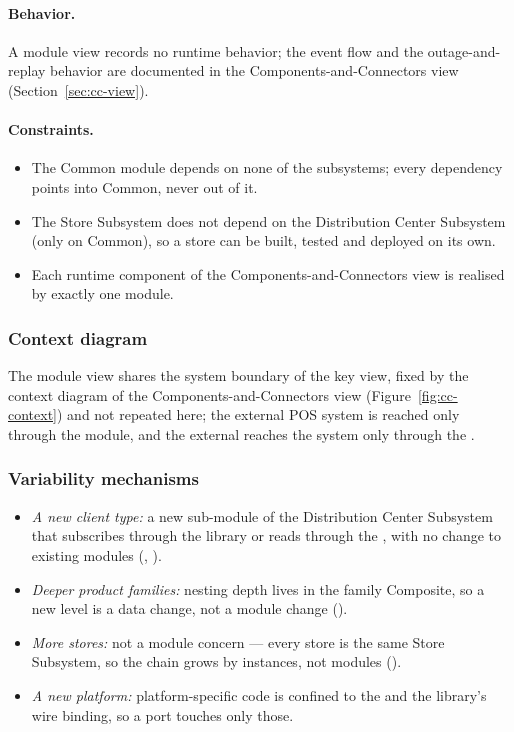 \paragraph{Behavior.}
A module view records no runtime behavior; the event flow and the outage-and-replay
behavior are documented in the Components-and-Connectors view (Section~\ref{sec:cc-view}).

\paragraph{Constraints.}
\begin{itemize}[nosep]
  \item The Common module depends on none of the subsystems; every dependency points into
  Common, never out of it.
  \item The Store Subsystem does not depend on the Distribution Center Subsystem (only on
  Common), so a store can be built, tested and deployed on its own.
  \item Each runtime component of the Components-and-Connectors view is realised by exactly
  one module.
\end{itemize}

\subsubsection{Context diagram}
The module view shares the system boundary of the key view, fixed by the context diagram
of the Components-and-Connectors view (Figure~\ref{fig:cc-context}) and not repeated here;
the external POS system is reached only through the \POSAdapter module, and the external
\AnalyticsClient reaches the system only through the \InventoryQuery.

\subsubsection{Variability mechanisms}
\label{sec:module-variability}
\begin{itemize}[nosep]
  \item \emph{A new client type:} a new sub-module of the Distribution Center Subsystem
  that subscribes through the \IEP library or reads through the \InventoryQuery, with no
  change to existing modules (, ).
  \item \emph{Deeper product families:} nesting depth lives in the family Composite, so a
  new level is a data change, not a module change ().
  \item \emph{More stores:} not a module concern --- every store is the same Store
  Subsystem, so the chain grows by instances, not modules ().
  \item \emph{A new platform:} platform-specific code is confined to the \POSAdapter and
  the \IEP library's wire binding, so a port touches only those.
\end{itemize}

